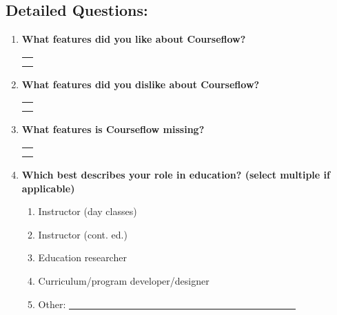 \documentclass{article}
\begin{document}
\subsection*{Detailed Questions:}



\begin{enumerate}
\item \textbf{What features did you like about Courseflow?}

\begin{tabularx}{0.9\textwidth}{X}
\\
\hline
\\
\hline
\\
\hline
\\
\hline
\end{tabularx}

\item \textbf{What features did you dislike about Courseflow?}

\begin{tabularx}{0.9\textwidth}{X}
\\
\hline
\\
\hline
\\
\hline
\\
\hline
\end{tabularx}

\item \textbf{What features is Courseflow missing?}

\begin{tabularx}{0.9\textwidth}{X}
\\
\hline
\\
\hline
\\
\hline
\\
\hline
\end{tabularx}

\clearpage

\item \textbf{Which best describes your role in education? (select multiple if applicable)}
\begin{enumerate}
\item Instructor (day classes)
\item Instructor (cont. ed.)
\item Education researcher
\item Curriculum/program developer/designer
\item Other: \underline{~~~~~~~~~~~~~~~~~~~~~~~~~~~~~~~~~~~~~~~~~~~~~~~}
\end{enumerate}



\end{enumerate}
\end{document}
